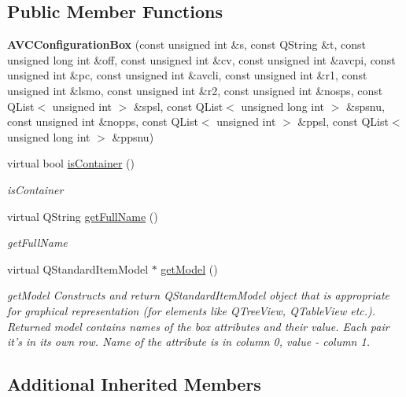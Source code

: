 \subsection*{Public Member Functions}
\begin{DoxyCompactItemize}
\item 
\hypertarget{class_a_v_c_configuration_box_a04dd50402b660e821358ede8ecee5aff}{{\bfseries A\-V\-C\-Configuration\-Box} (const unsigned int \&s, const Q\-String \&t, const unsigned long int \&off, const unsigned int \&cv, const unsigned int \&avcpi, const unsigned int \&pc, const unsigned int \&avcli, const unsigned int \&r1, const unsigned int \&lsmo, const unsigned int \&r2, const unsigned int \&nosps, const Q\-List$<$ unsigned int $>$ \&spsl, const Q\-List$<$ unsigned long int $>$ \&spsnu, const unsigned int \&nopps, const Q\-List$<$ unsigned int $>$ \&ppsl, const Q\-List$<$ unsigned long int $>$ \&ppsnu)}\label{class_a_v_c_configuration_box_a04dd50402b660e821358ede8ecee5aff}

\item 
virtual bool \hyperlink{class_a_v_c_configuration_box_a626fddbe3ea41877e8a8e97335948339}{is\-Container} ()
\begin{DoxyCompactList}\small\item\em is\-Container \end{DoxyCompactList}\item 
virtual Q\-String \hyperlink{class_a_v_c_configuration_box_a2cd37cfa63d1fa4130c6cd853a371e6f}{get\-Full\-Name} ()
\begin{DoxyCompactList}\small\item\em get\-Full\-Name \end{DoxyCompactList}\item 
virtual Q\-Standard\-Item\-Model $\ast$ \hyperlink{class_a_v_c_configuration_box_a034f358eb5231b98effd3835f81f538a}{get\-Model} ()
\begin{DoxyCompactList}\small\item\em get\-Model Constructs and return Q\-Standard\-Item\-Model object that is appropriate for graphical representation (for elements like Q\-Tree\-View, Q\-Table\-View etc.). Returned model contains names of the box attributes and their value. Each pair it's in its own row. Name of the attribute is in column 0, value -\/ column 1. \end{DoxyCompactList}\end{DoxyCompactItemize}
\subsection*{Additional Inherited Members}


